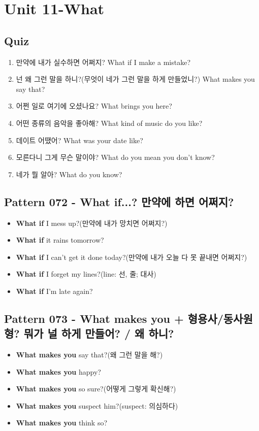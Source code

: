 \documentclass[11pt]{oblivoir}
\begin{document}
\section{Unit 11-What}
\subsection{Quiz}
\begin{enumerate}
  \color{red} \item 만약에 내가 실수하면 어쩌지?
    \color{light-gray} What if I make a mistake?
  \color{red} \item 넌 왜 그런 말을 하니?(무엇이 네가 그런 말을 하게 만들었니?)
    \color{light-gray} What makes you say that?
  \color{red} \item 어쩐 일로 여기에 오셨나요?
    \color{light-gray} What brings you here?
  \color{black} \item 어떤 종류의 음악을 좋아해?
    \color{light-gray} What kind of music do you like?
  \color{red} \item 데이트 어땠어?
    \color{light-gray} What was your date like?
  \color{red} \item 모른다니 그게 무슨 말이야?
    \color{light-gray} What do you mean you don't know?
   \color{black} \item 네가 뭘 알아?
    \color{light-gray} What do you know?
\end{enumerate}

\subsection{Pattern 072 - What if...? 만약에 \texttildelow 하면 어쩌지?}
\begin{itemize}
  \item \textbf{What if} I mess up?(만약에 내가 망치면 어쩌지?)
  \item \textbf{What if} it rains tomorrow?
  \item \textbf{What if} I can't get it done today?(만약에 내가 오늘 다 못 끝내면 어쩌지?)
  \item \textbf{What if} I forget my lines?(line: 선, 줄; 대사)
  \item \textbf{What if} I'm late again?
\end{itemize}

\subsection{Pattern 073 - What makes you + 형용사/동사원형? 뭐가 널 \texttildelow 하게 만들어? / 왜 \texttildelow 하니?}
\begin{itemize}
  \item \textbf{What makes you} say that?(왜 그런 말을 해?)
  \item \textbf{What makes you} happy?
  \item \textbf{What makes you} so sure?(어떻게 그렇게 확신해?)
  \item \textbf{What makes you} suspect him?(suspect: 의심하다)
  \item \textbf{What makes you} think so?
\end{itemize}
\end{document}

